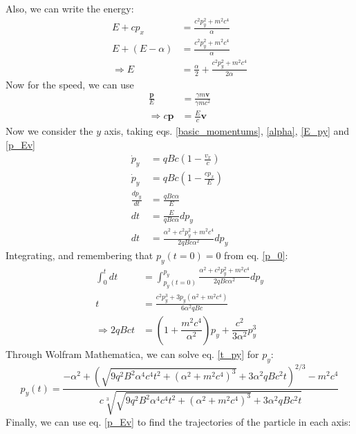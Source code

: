 \documentclass[]{article}
\numberwithin{equation}{section}
\newcommand{\0}{\textcolor{gray}{0}}
\begin{document}
Also, we can write the energy:
\begin{align}
	E + cp_x &= \frac{c^2p_y^2 + m^2c^4}{\alpha}\nonumber\\
	E + (E - \alpha) &= \frac{c^2p_y^2 + m^2c^4}{\alpha}\nonumber\\
	\Rightarrow E &= \frac{\alpha}{2} + \frac{c^2p_y^2 + m^2c^4}{2\alpha}\label{E_py}
\end{align}
Now for the speed, we can use
\begin{align}
	\frac{\mathbf{p}}{E} &= \frac{\gamma m \mathbf{v}}{\gamma m c^2}\nonumber\\
	\Rightarrow c\mathbf{p} &= \frac{E}{c}\mathbf{v}\label{p_Ev}%
\end{align}
Now we consider the \(y\) axis, taking eqs. \ref{basic_momentums}, \ref{alpha}, \ref{E_py} and \ref{p_Ev}
\begin{align}
	\dot{p}_y &= q B c(1 - \frac{v_x}{c})\nonumber\\
	\dot{p}_y &= q B c(1 - \frac{c p_x}{E})\nonumber\\
	\frac{dp_y}{dt} &= \frac{q B c \alpha}{E}\nonumber\\
	dt &= \frac{E}{q B c \alpha}dp_y\label{dt_E_dpy}\\
	dt &= \frac{\alpha^2 + c^2p_y^2 + m^2c^4}{2 q B c \alpha^2}dp_y\label{dt_dpy}
\end{align}
Integrating, and remembering that \(p_y(t=0) = 0\) from eq. \ref{p_0}:
\begin{align}
	\int_{0}^{t} dt &= \int_{p_y(t=0)}^{p_y}\frac{\alpha^2 + c^2p_y^2 + m^2c^4}{2 q B c \alpha^2}dp_y\nonumber\\
	t &= \frac{c^2 p_y^3 + 3 p_y \left(\alpha^2 + m^2c^4 \right)}{6 \alpha^2 q B c}\nonumber\\
	\Rightarrow 2 q B c t &= \left(1 + \dfrac{m^2c^4}{\alpha^2}\right)p_y + \dfrac{c^2}{3\alpha^2}p_y^3\label{t_py}
\end{align}
Through Wolfram Mathematica, we can solve eq. \ref{t_py} for \(p_y\):
\begin{equation}
p_y(t) = \frac{-\alpha ^2+\left(\sqrt{9 q^2 B^2 \alpha ^4 c^4 t^2 + \left(\alpha ^2 + m^2 c^4 \right)^3}+3 \alpha ^2 q B c^2 t\right)^{2/3} - m^2 c^4}{c \sqrt[3]{\sqrt{9 q^2 B^2 \alpha ^4 c^4 t^2+\left(\alpha ^2 + m^2 c^4 \right)^3}+3 \alpha ^2 q B c^2 t}}\label{py_t}
\end{equation}
Finally, we can use eq. \ref{p_Ev} to find the trajectories of the particle in each axis:
\end{document}
